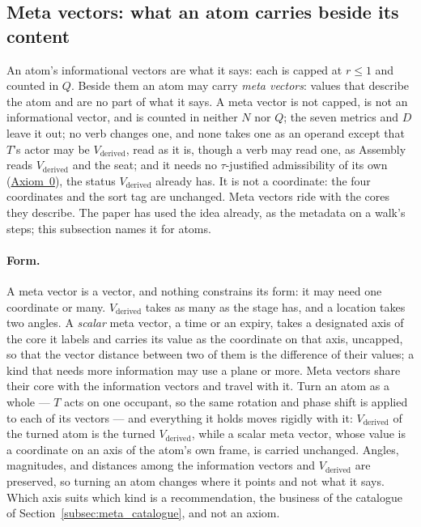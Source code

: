 \documentclass[12pt, a4paper]{article}
\begin{document}
\subsection{Meta vectors: what an atom carries beside its content}
\label{subsec:meta_vectors}
An atom's informational vectors are what it says: each is capped at
$r\le1$ and counted in $Q$. Beside them an atom may carry \emph{meta
vectors}: values that describe the atom and are no part of what it
says. A meta vector is not capped, is not an informational vector, and
is counted in neither $N$ nor $Q$; the seven metrics and $D$ leave
it out; no verb changes one, and none takes one as an operand except that $T$'s
actor may be $V_{\text{derived}}$, read as it is, though a verb may
read one, as Assembly reads $V_{\text{derived}}$ and the seat; and it
needs no $\tau$-justified admissibility of its own (\hyperref[subsec:axiom0_admissibility]{Axiom~0}), the status
$V_{\text{derived}}$ already has. It is not a coordinate: the four
coordinates and the sort tag are unchanged. Meta vectors ride with the
cores they describe. The paper has used the idea already, as the
metadata on a walk's steps; this subsection names it for atoms.

\paragraph{Form.} A meta vector is a vector, and nothing constrains its
form: it may need one coordinate or many. $V_{\text{derived}}$ takes as
many as the stage has, and a location takes two angles. A \emph{scalar}
meta vector, a time or an expiry, takes a designated axis of the core it
labels and carries its value as the coordinate on that axis, uncapped, so
that the vector distance between two of them is the difference of their
values; a kind that needs more information may use a plane or more. Meta
vectors share their core with the information vectors and travel with it.
Turn an atom as a whole --- $T$ acts on one occupant, so the same
rotation and phase shift is applied to each of its vectors --- and
everything it holds moves rigidly with it: $V_{\text{derived}}$ of the
turned atom is the turned $V_{\text{derived}}$, while a scalar meta
vector, whose value is a coordinate on an axis of the atom's own frame, is
carried unchanged. Angles, magnitudes, and distances among the
information vectors and $V_{\text{derived}}$ are preserved, so turning an
atom changes where it points and not what it says. Which axis suits which
kind is a recommendation, the business of the catalogue of
Section~\ref{subsec:meta_catalogue}, and not an axiom.
\end{document}
